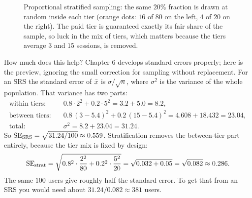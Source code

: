 \begin{figure}[H]
\centering
{}
\caption{Proportional stratified sampling: the same $20\%$ fraction is drawn at random
inside each tier (orange dots: $16$ of $80$ on the left, $4$ of $20$ on the right). The
paid tier is guaranteed exactly its fair share of the sample, so luck in the mix of tiers,
which matters because the tiers average $3$ and $15$ sessions, is removed.}
\label{fig:sampling-stratified}
\end{figure}

How much does this help? Chapter 6 develops standard errors properly; here is the
preview, ignoring the small correction for sampling without replacement. For an SRS the
standard error of $\bar{x}$ is $\sigma/\sqrt n$, where $\sigma^2$ is the variance of the
whole population. That variance has two parts:
\begin{align*}
  \text{within tiers:}\quad & 0.8\cdot 2^2 + 0.2\cdot 5^2 = 3.2 + 5.0 = 8.2,\\
  \text{between tiers:}\quad & 0.8\,(3-5.4)^2 + 0.2\,(15-5.4)^2 = 4.608 + 18.432 = 23.04,\\
  \text{total:}\quad & \sigma^2 = 8.2 + 23.04 = 31.24 .
\end{align*}
So $\operatorname{SE}_{\text{SRS}} = \sqrt{31.24/100} \approx 0.559$. Stratification removes the
between-tier part entirely, because the tier mix is fixed by design:
\[
  \operatorname{SE}_{\text{strat}} = \sqrt{0.8^2\cdot\frac{2^2}{80} + 0.2^2\cdot\frac{5^2}{20}}
  = \sqrt{0.032 + 0.05} = \sqrt{0.082} \approx 0.286 .
\]
The same $100$ users give roughly half the standard error. To get that from an SRS you
would need about $31.24/0.082 \approx 381$ users.

